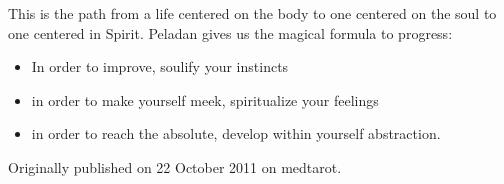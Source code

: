 This is the path from a life centered on the body to one centered on the soul to one centered in Spirit. Peladan gives us the magical formula to progress:

\begin{itemize}


\item In order to improve, soulify your instincts

\item in order to make yourself meek, spiritualize your feelings

\item in order to reach the absolute, develop within yourself abstraction.
\end{itemize}

Originally published on 22 October 2011 on medtarot.



